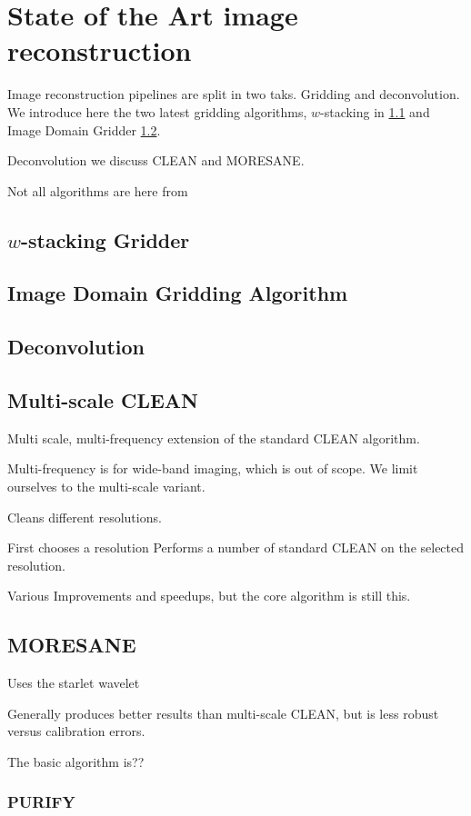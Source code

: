 \section{State of the Art image reconstruction}\label{state}

Image reconstruction pipelines are split in two taks. Gridding and deconvolution. We introduce here the two latest gridding algorithms, $w$-stacking in \ref{state:wstack} and Image Domain Gridder \ref{state:idg}.

Deconvolution we discuss CLEAN and MORESANE.

Not all algorithms are here from

\subsection{$w$-stacking Gridder}\label{state:wstack}

\subsection{Image Domain Gridding Algorithm}\label{state:idg}

\subsection{Deconvolution}

\subsection{Multi-scale CLEAN}

Multi scale, multi-frequency extension of the standard CLEAN algorithm.

Multi-frequency is for wide-band imaging, which is out of scope. We limit ourselves to the multi-scale variant.

Cleans different resolutions.

First chooses a resolution
Performs a number of standard CLEAN on the selected resolution.

Various Improvements and speedups\cite{clark1980efficient, schwab1984relaxing, rau2011multi, offringa2017optimized}, but the core algorithm is still this.

\subsection{MORESANE}

Uses the starlet wavelet

Generally produces better results than multi-scale CLEAN, but is less robust versus calibration errors.

The basic algorithm is??

\subsubsection{PURIFY}




